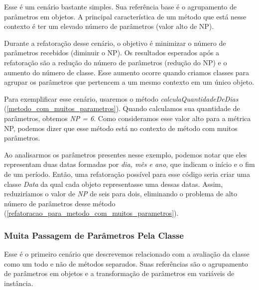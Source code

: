 	Esse é um cenário bastante simples. Sua referência base é o agrupamento de parâmetros em objetos. A principal característica de um método que está nesse contexto é ter um elevado número de parâmetros (valor alto de NP).
	
	Durante a refatoração desse cenário, o objetivo é minimizar o número de parâmetros recebidos (diminuir o NP). Os resultados esperados após a refatoração são a redução do número de parâmetros (redução do NP) e o aumento do número de classe. Esse aumento ocorre quando criamos classes para agrupar os parâmetros que pertencem a um mesmo contexto em um único objeto.
	                                       
	Para exemplificar esse cenário, usaremos o método \textit{calculaQuantidadeDeDias} (\ref{metodo_com_muitos_parametros}). Quando calculamos sua quantidade de parâmetros, obtemos \textit{NP = 6}. Como consideramos esse valor alto para a métrica NP, podemos dizer que esse método está no contexto de método com muitos parâmetros.                    

                   
                                
	Ao analisarmos os parâmetros presentes nesse exemplo, podemos notar que eles representam duas datas formadas por \textit{dia, mês e ano}, que indicam o início e o fim de um período. Então, uma refatoração possível para esse código seria criar uma classe \textit{Data} da qual cada objeto representasse uma dessas datas. Assim, reduziríamos o valor de \textit{NP} de seis para dois, eliminando o problema de alto número de parâmetros desse método (\ref{refatoracao_para_metodo_com_muitos_parametros}). 

          

\subsubsection{Muita Passagem de Parâmetros Pela Classe}
	
	Esse é o primeiro cenário que descrevemos relacionado com a avaliação da classe como um todo e não de métodos separados. Suas referências são o agrupamento de parâmetros em objetos e a transformação de parâmetros em variáveis de instância.
	
